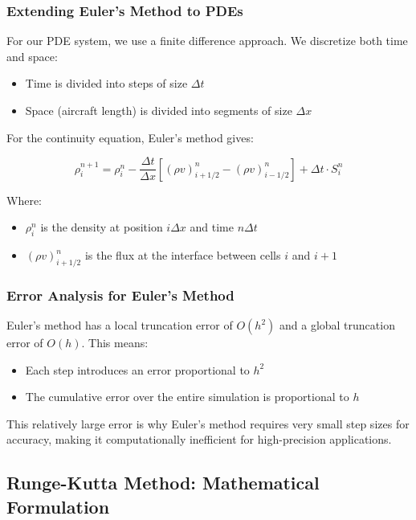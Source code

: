 \documentclass[a4paper,12pt]{article}
\begin{document}
\subsubsection{Extending Euler's Method to PDEs}

For our PDE system, we use a finite difference approach. We discretize both time and space:
\begin{itemize}
    \item Time is divided into steps of size $\Delta t$
    \item Space (aircraft length) is divided into segments of size $\Delta x$
\end{itemize}

For the continuity equation, Euler's method gives:

\begin{equation}
\rho_i^{n+1} = \rho_i^n - \frac{\Delta t}{\Delta x}[(\rho v)_{i+1/2}^n - (\rho v)_{i-1/2}^n] + \Delta t \cdot S_i^n
\end{equation}

Where:
\begin{itemize}
    \item $\rho_i^n$ is the density at position $i\Delta x$ and time $n\Delta t$
    \item $(\rho v)_{i+1/2}^n$ is the flux at the interface between cells $i$ and $i+1$
\end{itemize}

\subsubsection{Error Analysis for Euler's Method}

Euler's method has a local truncation error of $O(h^2)$ and a global truncation error of $O(h)$. This means:
\begin{itemize}
    \item Each step introduces an error proportional to $h^2$
    \item The cumulative error over the entire simulation is proportional to $h$
\end{itemize}

This relatively large error is why Euler's method requires very small step sizes for accuracy, making it computationally inefficient for high-precision applications.

\subsection{Runge-Kutta Method: Mathematical Formulation}
\end{document}
